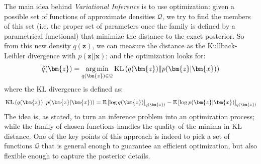 
The main idea behind \textit{Variational Inference} is to use optimization: given a possible set of functions of approximate densities $\mathcal{Q}$, we try to find the members of this set (i.e. the proper set of parameters once the family is defined by a parametrical functional) that minimize the distance to the exact posterior. So from this new density $q(\bm{z})$, we can measure the distance as the Kullback-Leibler divergence with $p(\bm{z}|]\bm{x})$; and the optimization looks for:
\begin{equation}
    \tilde{q}(\bm{z}) = \argmin{q(\bm{z}) \in \mathcal{Q}} \KLD{q(\bm{z})}{p(\bm{z}|\bm{x})}
    \label{eq:variational_inference}
\end{equation}
where the KL divergence is defined as:
\begin{equation}
    \KLD{q(\bm{z})}{p(\bm{z}|\bm{x})} = \expectation{\log q(\bm{z})}_{q(\bm{z})} - \expectation{\log p(\bm{z}|\bm{x})}_{q(\bm{z})}
    \label{eq:kulback-leibler}
\end{equation}
The idea is, as stated, to turn an inference problem into an optimization process; while the family of chosen functions handles the quality of the minima in KL distance. One of the key points of this approach is indeed to pick a set of functions $\mathcal{Q}$ that is general enough to guarantee an efficient optimization, but also flexible enough to capture the posterior details.

